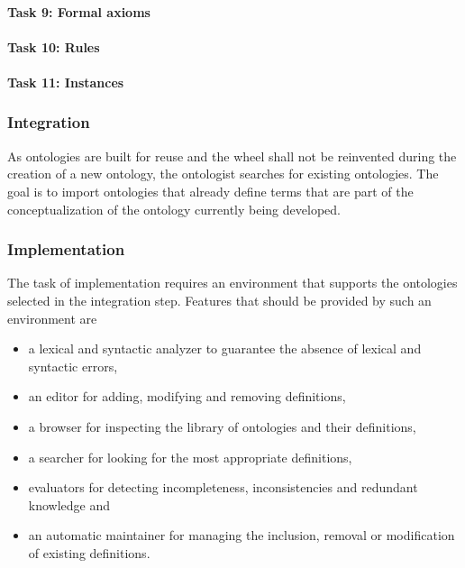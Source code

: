 \paragraph{Task 9: Formal axioms}


\paragraph{Task 10: Rules}


\paragraph{Task 11: Instances}


\subsubsection{Integration}

As ontologies are built for reuse and the wheel shall not be reinvented during the creation of a new ontology, the ontologist searches for existing ontologies. The goal is to import ontologies that already define terms that are part of the conceptualization of the ontology currently being developed.

\subsubsection{Implementation}

The task of implementation requires an environment that supports the ontologies selected in the integration step. Features that should be provided by such an environment are

\begin{itemize}
  \item a lexical and syntactic analyzer to guarantee the absence of lexical and syntactic errors,
  \item an editor for adding, modifying and removing definitions,
  \item a browser for inspecting the library of ontologies and their definitions,
  \item a searcher for looking for the most appropriate definitions,
  \item evaluators for detecting incompleteness, inconsistencies and redundant knowledge and
  \item an automatic maintainer for managing the inclusion, removal or modification of existing definitions.
\end{itemize}
 

